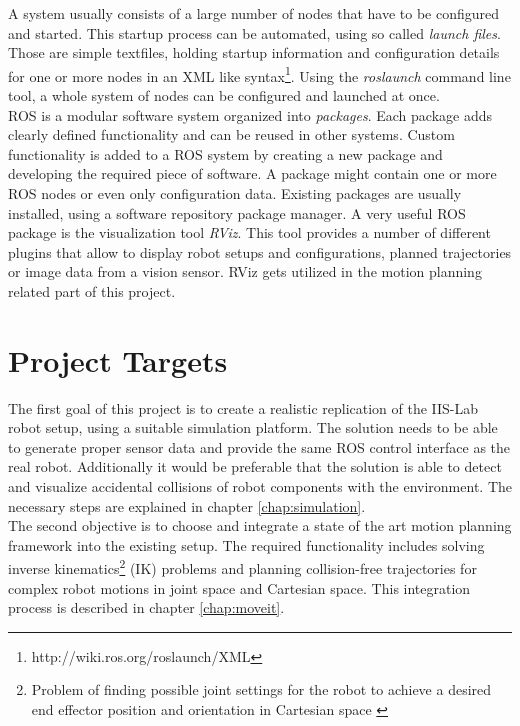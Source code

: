 A system usually consists of a large number of nodes that have to be configured and started. This startup process can be automated, using so called \emph{launch files}. Those are simple textfiles, holding startup information and configuration details for one or more nodes in an XML like syntax\footnote{http://wiki.ros.org/roslaunch/XML}. Using the \emph{roslaunch} command line tool, a whole system of nodes can be configured and launched at once. \\

ROS is a modular software system organized into \emph{packages}. Each package adds clearly defined functionality and can be reused in other systems. Custom functionality is added to a ROS system by creating a new package and developing the required piece of software. A package might contain one or more ROS nodes or even only configuration data. Existing packages are usually installed, using a software repository package manager. A very useful ROS package is the visualization tool \emph{RViz}. This tool provides a number of different plugins that allow to display robot setups and configurations, planned trajectories or image data from a vision sensor. RViz gets utilized in the motion planning related part of this project.

\section{Project Targets}

The first goal of this project is to create a realistic replication of the IIS-Lab robot setup, using a suitable simulation platform. The solution needs to be able to generate proper sensor data and provide the same ROS control interface as the real robot. Additionally it would be preferable that the solution is able to detect and visualize accidental collisions of robot components with the environment. The necessary steps are explained in chapter \ref{chap:simulation}.\\

The second objective is to choose and integrate a state of the art motion planning framework into the existing setup. The required functionality includes solving inverse kinematics\footnote{Problem of finding possible joint settings for the robot to achieve a desired end effector position and orientation in Cartesian space \citep{craig2005}} (IK) problems and planning collision-free trajectories for complex robot motions in joint space and Cartesian space. This integration process is described in chapter \ref{chap:moveit}. \\

